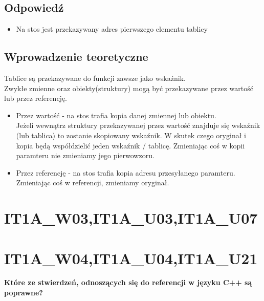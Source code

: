 \subsection{Odpowiedź}
\begin{itemize}
\item Na stos jest przekazywany adres pierwszego elementu tablicy\\
\end{itemize}

\subsection{Wprowadzenie teoretyczne}
Tablice są przekazywane do funkcji zawsze jako wskaźnik.\\
Zwykłe zmienne oraz obiekty(struktury) mogą być przekazywane przez wartość lub przez referencję.
\begin{itemize}
\item Przez wartość - na stos trafia kopia danej zmiennej lub obiektu.\\
Jeżeli wewnątrz struktury przekazywanej przez wartość znajduje się wskaźnik (lub tablica) to zostanie skopiowany wskaźnik. W skutek czego oryginał i kopia będą współdzielić jeden wskaźnik / tablicę. Zmieniając coś w kopii paramteru nie zmieniamy jego pierwowzoru.
\item Przez referencję - na stos trafia kopia adresu przesyłanego paramteru. Zmieniając coś w referencji, zmieniamy oryginał.
\end{itemize}

\section{IT1A\_W03,IT1A\_U03,IT1A\_U07} 


\section{IT1A\_W04,IT1A\_U04,IT1A\_U21} 
\textbf{Które ze stwierdzeń, odnoszących się do referencji w języku C++ są poprawne?}

